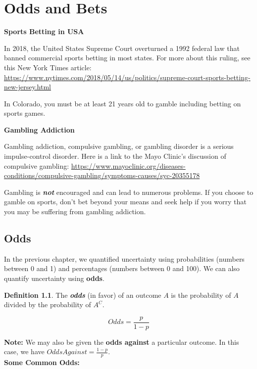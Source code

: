 \documentclass[
  11pt,
]{book}
\theoremstyle{definition}
\newtheorem{definition}{Definition}[chapter]
\theoremstyle{definition}
\theoremstyle{definition}
\theoremstyle{definition}
\theoremstyle{remark}
\begin{document}
\hypertarget{odds-and-bets}{%
\chapter{Odds and Bets}\label{odds-and-bets}}

\textbf{Sports Betting in USA}

In 2018, the United States Supreme Court overturned a 1992 federal law that banned commercial sports betting in most states. For more about this ruling, see this New York Times article: \url{https://www.nytimes.com/2018/05/14/us/politics/supreme-court-sports-betting-new-jersey.html}

In Colorado, you must be at least 21 years old to gamble including betting on sports games.

\textbf{Gambling Addiction}

Gambling addiction, compulsive gambling, or gambling disorder is a serious impulse-control disorder. Here is a link to the Mayo Clinic's discussion of compulsive gambling: \url{https://www.mayoclinic.org/diseases-conditions/compulsive-gambling/symptoms-causes/syc-20355178}

Gambling is \textbf{\emph{not}} encouraged and can lead to numerous problems. If you choose to gamble on sports, don't bet beyond your means and seek help if you worry that you may be suffering from gambling addiction.

\newpage

\hypertarget{odds}{%
\section{Odds}\label{odds}}

In the previous chapter, we quantified uncertainty using probabilities (numbers between 0 and 1) and percentages (numbers between 0 and 100). We can also quantify uncertainty using \textbf{odds}.

\begin{definition}
The \textbf{\emph{odds}} (in favor) of an outcome \(A\) is the probability of \(A\) divided by the probability of \(A^C\).

\[Odds = \frac{p}{1-p}\]
\end{definition}

\textbf{Note:} We may also be given the \textbf{odds against} a particular outcome. In this case, we have \(Odds Against = \frac{1-p}{p}\).\\

\textbf{Some Common Odds:}
\end{document}
